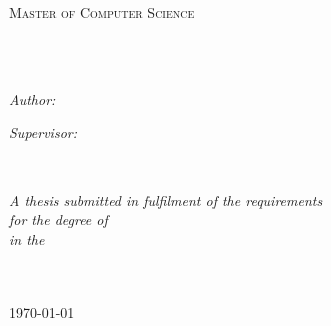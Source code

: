 \documentclass[11pt, english, openany, singlespacing, headsepline]{classes/ResearchTopic}
\author{Teklit \textsc{Haphtu}} %
\begin{document}
\frontmatter %

\pagestyle{plain} %


\begin{titlepage}
\begin{center}

\vspace*{.06\textheight}
{\scshape\LARGE \univname\par}\vspace{1.5cm} %
\textsc{\Large Master of Computer Science}\\[0.5cm] %

\HRule \\[0.4cm] %
{\huge \bfseries \ttitle\par}\vspace{0.4cm} %
\HRule \\[1.5cm] %
 
\begin{minipage}[t]{0.4\textwidth}
\begin{flushleft} \large
\emph{Author:}\\
\href{http://www.makeitsimple.com}{\authorname} %
\end{flushleft}
\end{minipage}
\begin{minipage}[t]{0.4\textwidth}
\begin{flushright} \large
\emph{Supervisor:} \\
\href{https://people.utwente.nl/m.elhajj}{\supname} %
\end{flushright}
\end{minipage}\\[3cm]
 
\vfill

\large \textit{A thesis submitted in fulfilment of the requirements\\ for the degree of \degreename}\\[0.3cm] %
\textit{in the}\\[0.4cm]
\groupname\\\deptname\\[2cm] %

\vfill

{\large \today}\\[4cm] %
 
\vfill
\end{center}
\end{titlepage}
\end{document}
